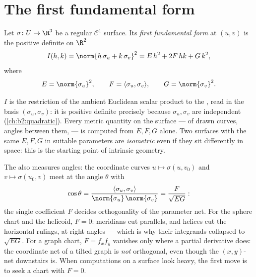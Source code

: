 \section{The first fundamental form}

\begin{definition}\label{def:b2:surfaces:fff}
Let $\sigma \colon U \to \R^3$ be a regular $\mathcal{C}^1$
surface. Its \emph{first fundamental form} at $(u,v)$ is the
positive definite  on $\R^2$
\[
I(h, k) = \norm{h\,\sigma_u + k\,\sigma_v}^2
= E\,h^2 + 2F\,hk + G\,k^2,
\]
where
\[
E = \norm{\sigma_u}^2,
\qquad
F = \langle \sigma_u, \sigma_v\rangle,
\qquad
G = \norm{\sigma_v}^2 .
\]
\end{definition}

\begin{remark}
$I$ is the restriction of the ambient Euclidean scalar product to
the , read in the basis $(\sigma_u, \sigma_v)$: it is
positive definite precisely because $\sigma_u, \sigma_v$ are
independent (\cref{ch:b2:quadratic}). Every metric quantity on the
surface ---  of drawn curves, angles between them,  ---
is computed from $E, F, G$ alone. Two surfaces with the same $E,
F, G$ in suitable parameters are \emph{isometric} even if they sit
differently in space: this is the starting point of intrinsic
geometry.
\end{remark}

\begin{example}\label{ex:b2:surfaces:coordangle}
The  also measures angles: the
coordinate curves $u \mapsto \sigma(u, v_0)$ and $v \mapsto
\sigma(u_0, v)$ meet at the angle $\theta$ with
\[
\cos\theta = \frac{\langle\sigma_u,
\sigma_v\rangle}{\norm{\sigma_u}\,\norm{\sigma_v}}
= \frac{F}{\sqrt{EG}} :
\]
the single coefficient $F$ decides orthogonality of the
parameter net. For the sphere chart and the helicoid, $F =
0$: meridians cut parallels, and helices cut the horizontal
rulings, at right angles --- which is why their 
integrands collapsed to $\sqrt{EG}$. For a graph chart,
$F = f_xf_y$ vanishes only where a partial derivative does:
the coordinate net of a tilted graph is \emph{not}
orthogonal, even though the $(x, y)$-net downstairs is. When
computations on a surface look heavy, the first move is to
seek a chart with $F = 0$.
\end{example}

